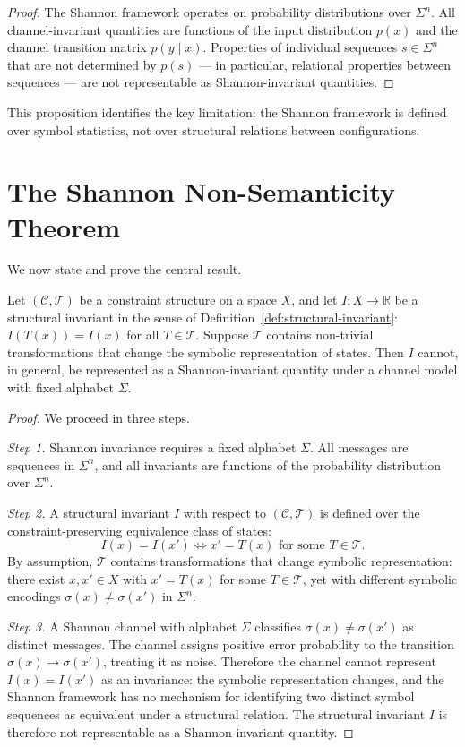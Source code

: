 \documentclass[11pt,openany]{book}
\begin{document}
\begin{proof}
The Shannon framework operates on probability distributions
over $\Sigma^n$.  All channel-invariant quantities are
functions of the input distribution $p(x)$ and the
channel transition matrix $p(y \mid x)$.  Properties of
individual sequences $s \in \Sigma^n$ that are not
determined by $p(s)$ — in particular, relational properties
between sequences — are not representable as
Shannon-invariant quantities.
\end{proof}

This proposition identifies the key limitation: the Shannon
framework is defined over symbol statistics, not over
structural relations between configurations.

\section{The Shannon Non-Semanticity Theorem}
\label{sec:non-semanticity}

We now state and prove the central result.

\begin{theorem}
\label{thm:shannon-non-semanticity}
Let $(\mathcal{C}, \mathcal{T})$ be a constraint structure
on a space $X$, and let $I : X \to \mathbb{R}$ be a
structural invariant in the sense of
Definition~\ref{def:structural-invariant}: $I(T(x)) = I(x)$
for all $T \in \mathcal{T}$.  Suppose $\mathcal{T}$ contains
non-trivial transformations that change the symbolic
representation of states.  Then $I$ cannot, in general, be
represented as a Shannon-invariant quantity under a channel
model with fixed alphabet $\Sigma$.
\end{theorem}

\begin{proof}
We proceed in three steps.

\emph{Step 1.} Shannon invariance requires a fixed alphabet
$\Sigma$.  All messages are sequences in $\Sigma^n$, and all
invariants are functions of the probability distribution
over $\Sigma^n$.

\emph{Step 2.} A structural invariant $I$ with respect to
$(\mathcal{C}, \mathcal{T})$ is defined over the
constraint-preserving equivalence class of states:
\[
  I(x) = I(x') \iff x' = T(x) \text{ for some } T \in \mathcal{T}.
\]
By assumption, $\mathcal{T}$ contains transformations that
change symbolic representation: there exist $x, x' \in X$
with $x' = T(x)$ for some $T \in \mathcal{T}$, yet with
different symbolic encodings $\sigma(x) \neq \sigma(x')$
in $\Sigma^n$.

\emph{Step 3.} A Shannon channel with alphabet $\Sigma$
classifies $\sigma(x) \neq \sigma(x')$ as distinct messages.
The channel assigns positive error probability to the
transition $\sigma(x) \to \sigma(x')$, treating it as noise.
Therefore the channel cannot represent $I(x) = I(x')$ as an
invariance: the symbolic representation changes, and the
Shannon framework has no mechanism for identifying two
distinct symbol sequences as equivalent under a structural
relation.  The structural invariant $I$ is therefore not
representable as a Shannon-invariant quantity.
\end{proof}
\end{document}
